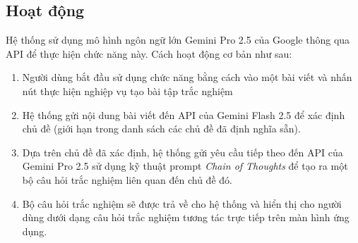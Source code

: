 \documentclass{uetgraduation}
\begin{document}
\subsection{Hoạt động}
Hệ thống sử dụng mô hình ngôn ngữ lớn Gemini Pro 2.5 của Google thông qua API để thực hiện chức năng này.
Cách hoạt động cơ bản như sau:
\begin{enumerate}
    \item Người dùng bắt đầu sử dụng chức năng bằng cách vào một bài viết và nhấn nút thực hiện nghiệp vụ tạo bài tập trắc nghiệm
    \item Hệ thống gửi nội dung bài viết đến API của Gemini Flash 2.5 để xác định chủ đề (giới hạn trong danh sách các chủ đề đã định nghĩa sẵn).
    \item Dựa trên chủ đề đã xác định, hệ thống gửi yêu cầu tiếp theo đến API của Gemini Pro 2.5 sử dụng kỹ thuật prompt \textit{Chain of Thoughts} để tạo ra một bộ câu hỏi trắc nghiệm liên quan đến chủ đề đó.
    \item Bộ câu hỏi trắc nghiệm sẽ được trả về cho hệ thống và hiển thị cho người dùng dưới dạng câu hỏi trắc nghiệm tương tác trực tiếp trên màn hình ứng dụng.
\end{enumerate}
\end{document}
